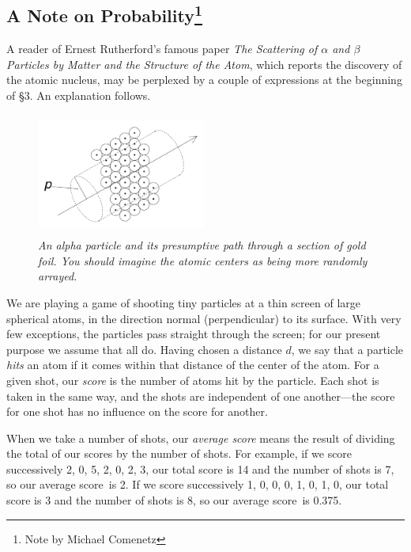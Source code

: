 \subsection*{A Note on Probability\footnote{Note by Michael Comenetz}}

A reader of Ernest Rutherford's famous paper \emph{The Scattering of $\alpha$
and $\beta$ Particles by Matter and the Structure of the Atom}, which reports
the discovery of the atomic nucleus, may be perplexed by a couple of
expressions at the beginning of §3. An explanation follows.

\begin{figure}[h]
  \begin{center}
    \includegraphics[width=2.1875in,height=1.57292in]{images/04_rutherford/collisions.png}
  \end{center}
    \caption*{\emph{An alpha particle and its presumptive path
      through a section of gold foil. You should imagine the atomic centers 
      as being more randomly arrayed.}}
\end{figure}

We are playing a game of shooting tiny particles at a thin screen of
large spherical atoms, in the direction normal (perpendicular) to its
surface. With very few exceptions, the particles pass straight through
the screen; for our present purpose we assume that all do. Having chosen
a distance $d$, we say that a particle \emph{hits} an atom if it
comes within that distance of the center of the atom. For a given shot,
our \emph{score} is the number of atoms hit by the particle. Each shot
is taken in the same way, and the shots are independent of one
another---the score for one shot has no influence on the score for
another.

When we take a number of shots, our \emph{average score} means the
result of dividing the total of our scores by the number of shots. For
example, if we score successively 2, 0, 5, 2, 0, 2, 3, our total score
is 14 and the number of shots is 7, so our average score~is 2. If we
score successively 1, 0, 0, 0, 1, 0, 1, 0, our total score is 3 and the
number of shots is 8, so our average score~is 0.375.

